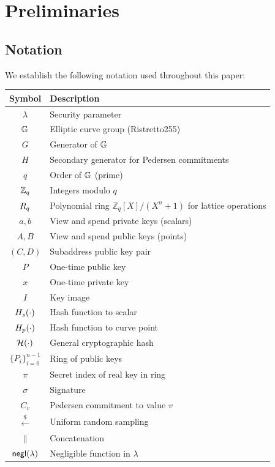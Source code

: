 
\section{Preliminaries}
\label{sec:preliminaries}

\subsection{Notation}

We establish the following notation used throughout this paper:

\begin{center}
\begin{tabular}{cl}
\toprule
\textbf{Symbol} & \textbf{Description} \\
\midrule
$\lambda$ & Security parameter \\
$\mathbb{G}$ & Elliptic curve group (Ristretto255) \\
$G$ & Generator of $\mathbb{G}$ \\
$H$ & Secondary generator for Pedersen commitments \\
$q$ & Order of $\mathbb{G}$ (prime) \\
$\mathbb{Z}_q$ & Integers modulo $q$ \\
$R_q$ & Polynomial ring $\mathbb{Z}_q[X]/(X^n + 1)$ for lattice operations \\
\midrule
$a, b$ & View and spend private keys (scalars) \\
$A, B$ & View and spend public keys (points) \\
$(C, D)$ & Subaddress public key pair \\
$P$ & One-time public key \\
$x$ & One-time private key \\
$I$ & Key image \\
\midrule
$H_s(\cdot)$ & Hash function to scalar \\
$H_p(\cdot)$ & Hash function to curve point \\
$\mathcal{H}(\cdot)$ & General cryptographic hash \\
\midrule
$\{P_i\}_{i=0}^{n-1}$ & Ring of public keys \\
$\pi$ & Secret index of real key in ring \\
$\sigma$ & Signature \\
$C_v$ & Pedersen commitment to value $v$ \\
\midrule
$\xleftarrow{\$}$ & Uniform random sampling \\
$\|$ & Concatenation \\
$\mathsf{negl}(\lambda)$ & Negligible function in $\lambda$ \\
\bottomrule
\end{tabular}
\end{center}

